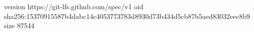 version https://git-lfs.github.com/spec/v1
oid sha256:15370915587b4dabc14c4053773783d8930d73b434d5cb87b5aed83032eec8b9
size 87544
